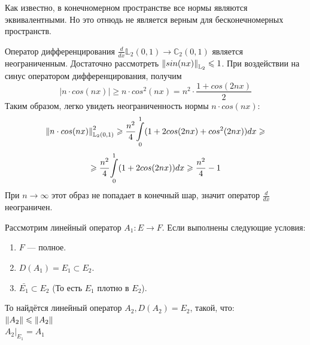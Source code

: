 	Как известно, в конечномерном пространстве все нормы являются эквивалентными. Но это отнюдь не является верным для бесконечномерных
	пространств.
	
	\example Оператор дифференцирования $\frac{d}{dx} \mathbb{L}_2(0, 1) \rightarrow \mathbb{C}_2(0, 1)$ является неограниченным. 
	Достаточно рассмотреть $\left\| sin(nx) \right\|_{\mathbb{L}_2} \leqslant 1$. При воздействии на синус оператором дифференцирования, получим
	$$|n \cdot cos(nx)| \geq n \cdot cos^2(nx) = n^2 \cdot \frac{1 + cos(2nx)}{2}$$
	Таким образом, легко увидеть неограниченность нормы $n \cdot cos(nx)$:
	$$\left\| n \cdot cos(nx) \right\|_{\mathbb{L}_2(0,1)}^2 \geqslant \frac{n^2}{4} \underset{0}{\overset{1}{\int}} (1 + 2 cos(2nx) + cos^2(2nx)) dx \geqslant$$
	$$\geqslant \frac{n^2}{4} \underset{0}{\overset{1}{\int}} (1 + 2 cos(2nx)) dx \geqslant \frac{n^2}{4} - 1$$
	При $n \rightarrow \infty$ этот образ не попадает в конечный шар, значит оператор $\frac{d}{dx}$ неограничен.
	
	
	\begin{theorem}
		Рассмотрим линейный оператор $A_1 : E \rightarrow F$. Если выполнены следующие условия:
		\begin{enumerate}
			\item $F$ --- полное.
			\item $D(A_1) = E_1 \subset E_2$.
			\item $\bar{E_1} \subset E_2$ (То есть $E_1$ плотно в $E_2$).
		\end{enumerate}
		То найдётся линейный оператор $A_2, D(A_2) = E_2$, такой, что: \\
		$\left\| A_2 \right\| \leqslant \left\| A_2 \right\|$ \\
		$A_2 |_{E_1} = A_1$
	\end{theorem}
	
